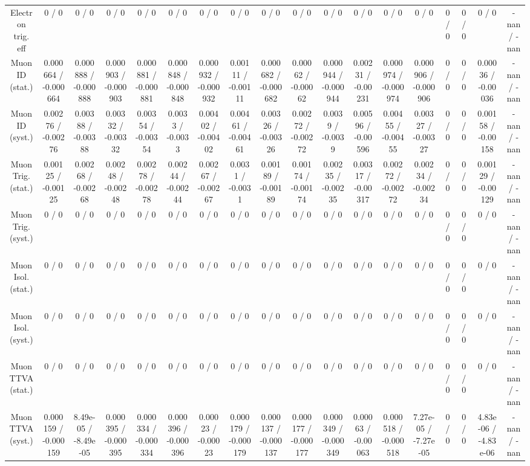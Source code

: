 \documentclass[10pt]{article}
\begin{document}
\begin{table}[htbp]
\begin{center}
\begin{tabular}{|c|c|c|c|c|c|c|c|c|c|c|c|c|c|c|c|c|c|}
  Electron trig. eff & 0 / 0 & 0 / 0 & 0 / 0 & 0 / 0 & 0 / 0 & 0 / 0 & 0 / 0 & 0 / 0 & 0 / 0 & 0 / 0 & 0 / 0 & 0 / 0 & 0 / 0 & 0 / 0 & 0 / 0 & 0 / 0 & -nan / -nan \\ 
  Muon ID (stat.) & 0.000664 / -0.000664 & 0.000888 / -0.000888 & 0.000903 / -0.000903 & 0.000881 / -0.000881 & 0.000848 / -0.000848 & 0.000932 / -0.000932 & 0.00111 / -0.00111 & 0.000682 / -0.000682 & 0.00062 / -0.00062 & 0.000944 / -0.000944 & 0.00231 / -0.00231 & 0.000974 / -0.000974 & 0.000906 / -0.000906 & 0 / 0 & 0 / 0 & 0.00036 / -0.00036 & -nan / -nan \\ 
  Muon ID (syst.) & 0.00276 / -0.00276 & 0.00388 / -0.00388 & 0.00332 / -0.00332 & 0.00354 / -0.00354 & 0.0033 / -0.0033 & 0.00402 / -0.00402 & 0.00461 / -0.00461 & 0.00326 / -0.00326 & 0.00272 / -0.00272 & 0.0039 / -0.0039 & 0.00596 / -0.00596 & 0.00455 / -0.00455 & 0.00327 / -0.00327 & 0 / 0 & 0 / 0 & 0.00158 / -0.00158 & -nan / -nan \\ 
  Muon Trig. (stat.) & 0.00125 / -0.00125 & 0.00268 / -0.00268 & 0.00248 / -0.00248 & 0.00278 / -0.00278 & 0.00244 / -0.00244 & 0.00267 / -0.00267 & 0.0031 / -0.0031 & 0.00189 / -0.00189 & 0.00174 / -0.00174 & 0.00235 / -0.00235 & 0.00317 / -0.00317 & 0.00272 / -0.00272 & 0.00234 / -0.00234 & 0 / 0 & 0 / 0 & 0.00129 / -0.00129 & -nan / -nan \\ 
  Muon Trig. (syst.) & 0 / 0 & 0 / 0 & 0 / 0 & 0 / 0 & 0 / 0 & 0 / 0 & 0 / 0 & 0 / 0 & 0 / 0 & 0 / 0 & 0 / 0 & 0 / 0 & 0 / 0 & 0 / 0 & 0 / 0 & 0 / 0 & -nan / -nan \\ 
  Muon Isol. (stat.) & 0 / 0 & 0 / 0 & 0 / 0 & 0 / 0 & 0 / 0 & 0 / 0 & 0 / 0 & 0 / 0 & 0 / 0 & 0 / 0 & 0 / 0 & 0 / 0 & 0 / 0 & 0 / 0 & 0 / 0 & 0 / 0 & -nan / -nan \\ 
  Muon Isol. (syst.) & 0 / 0 & 0 / 0 & 0 / 0 & 0 / 0 & 0 / 0 & 0 / 0 & 0 / 0 & 0 / 0 & 0 / 0 & 0 / 0 & 0 / 0 & 0 / 0 & 0 / 0 & 0 / 0 & 0 / 0 & 0 / 0 & -nan / -nan \\ 
  Muon TTVA (stat.) & 0 / 0 & 0 / 0 & 0 / 0 & 0 / 0 & 0 / 0 & 0 / 0 & 0 / 0 & 0 / 0 & 0 / 0 & 0 / 0 & 0 / 0 & 0 / 0 & 0 / 0 & 0 / 0 & 0 / 0 & 0 / 0 & -nan / -nan \\ 
  Muon TTVA (syst.) & 0.000159 / -0.000159 & 8.49e-05 / -8.49e-05 & 0.000395 / -0.000395 & 0.000334 / -0.000334 & 0.000396 / -0.000396 & 0.00023 / -0.00023 & 0.000179 / -0.000179 & 0.000137 / -0.000137 & 0.000177 / -0.000177 & 0.000349 / -0.000349 & 0.00063 / -0.00063 & 0.000518 / -0.000518 & 7.27e-05 / -7.27e-05 & 0 / 0 & 0 / 0 & 4.83e-06 / -4.83e-06 & -nan / -nan \\ 

\end{tabular}
\end{center}
\end{table}
\end{document}
